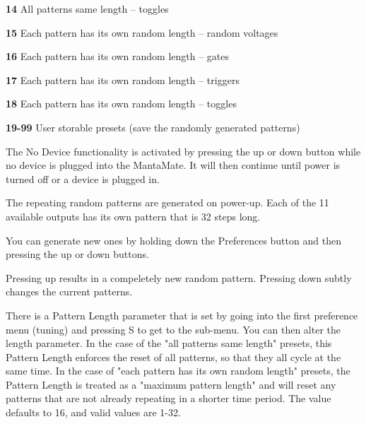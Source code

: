   \textbf{14}
  All patterns same length -- toggles

  \textbf{15}
  Each pattern has its own random length -- random voltages

  \textbf{16}
  Each pattern has its own random length -- gates

  \textbf{17}
  Each pattern has its own random length -- triggers

  \textbf{18}
  Each pattern has its own random length -- toggles

  \textbf{19-99}
  User storable presets (save the randomly generated patterns)


  The No Device functionality is activated by pressing the up or down button
  while no device is plugged into the MantaMate.
  It will then continue until power is turned off or a device is plugged in.

  The repeating random patterns are generated on power-up.
  Each of the 11 available outputs has its own pattern that is 32 steps long.

  You can generate new ones by holding down the Preferences button and then
  pressing the up or down buttons.

  Pressing up results in a compeletely new random pattern.
  Pressing down subtly changes the current patterns.

  There is a Pattern Length parameter that is set by going into the first
  preference menu (tuning) and pressing S to get to the sub-menu.
  You can then alter the length parameter.
  In the case of the "all patterns same length" presets,
  this Pattern Length enforces the reset of all patterns,
  so that they all cycle at the same time.
  In the case of "each pattern has its own random length"
  presets, the Pattern Length is treated as a "maximum pattern length"
  and will reset any patterns that are not already repeating in a shorter
  time period. The value defaults to 16, and valid values are 1-32.


